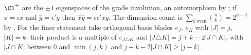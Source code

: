 $\Cl^{\pm}$ are the $\pm 1$ eigenspaces of the grade involution, an automorphism by ; if $\hat{x} = \epsilon x$ and $\hat{y} = \epsilon' y$ then $\widehat{xy} = \epsilon\epsilon' xy$. The dimension count is $\sum_{k \text{ even}} \binom{n}{k} = 2^{n-1}$ by . For the finer statement take orthogonal basis blades $e_J$, $e_K$ with $|J| = j$, $|K| = k$: their product is a multiple of $e_{J \triangle K}$ and $|J \triangle K| = j + k - 2|J \cap K|$, with $|J \cap K|$ between $0$ and $\min(j, k)$ and $j + k - 2|J \cap K| \ge |j - k|$.
